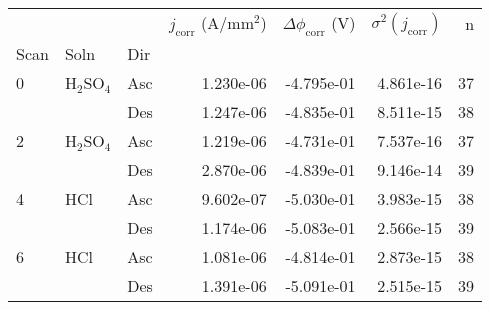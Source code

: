 \begin{tabular}{lllrrrr}
\toprule
  &     &     &  $j_{\text{corr}}$ (A/mm$^2$) &  $\Delta \phi_{\text{corr}}$ (V) &  $\sigma^2(j_{\text{corr}})$ &   n \\
Scan & Soln & Dir &                               &                                  &                              &     \\
\midrule
0 & H$_2$SO$_4$ & Asc &                     1.230e-06 &                       -4.795e-01 &                    4.861e-16 &  37 \\
  &     & Des &                     1.247e-06 &                       -4.835e-01 &                    8.511e-15 &  38 \\
2 & H$_2$SO$_4$ & Asc &                     1.219e-06 &                       -4.731e-01 &                    7.537e-16 &  37 \\
  &     & Des &                     2.870e-06 &                       -4.839e-01 &                    9.146e-14 &  39 \\
4 & HCl & Asc &                     9.602e-07 &                       -5.030e-01 &                    3.983e-15 &  38 \\
  &     & Des &                     1.174e-06 &                       -5.083e-01 &                    2.566e-15 &  39 \\
6 & HCl & Asc &                     1.081e-06 &                       -4.814e-01 &                    2.873e-15 &  38 \\
  &     & Des &                     1.391e-06 &                       -5.091e-01 &                    2.515e-15 &  39 \\
\bottomrule
\end{tabular}

